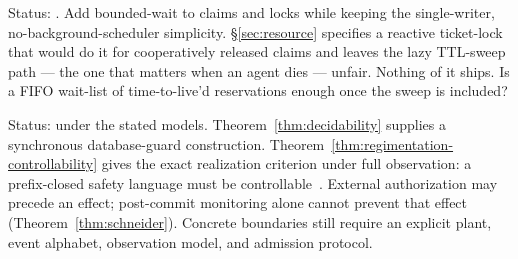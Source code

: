 \documentclass[11pt,a4paper]{article}
\theoremstyle{definition}
\theoremstyle{remark}
\begin{document}
\begin{description}[leftmargin=2.2em,style=nextline]
\item[$\bigstar$ OP-1 --- Fair exclusion without a scheduler.] Status: \Open. Add
bounded-wait to claims and locks while keeping the single-writer,
no-background-scheduler simplicity. \S\ref{sec:resource} specifies a reactive
ticket-lock that would do it for cooperatively released claims and leaves the lazy
TTL-sweep path --- the one that matters when an agent dies --- unfair. Nothing of it
ships. Is a FIFO wait-list of time-to-live'd reservations enough once the sweep is
included?
\item[$\bigstar$ OP-2 --- Regimentation vs.\ enforcement boundary.] Status: \Closed{} under the stated models.
Theorem~\ref{thm:decidability} supplies a synchronous database-guard
construction. Theorem~\ref{thm:regimentation-controllability} gives the exact
realization criterion under full observation: a prefix-closed safety language
must be controllable~. External authorization may precede
an effect; post-commit monitoring alone cannot prevent that effect
(Theorem~\ref{thm:schneider}). Concrete boundaries still require an explicit
plant, event alphabet, observation model, and admission protocol.


\end{description}
\end{document}
